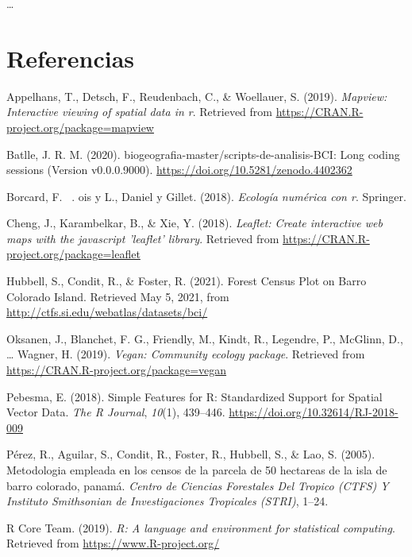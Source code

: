 \documentclass[11pt,]{article}
\begin{document}
\ldots

\section*{Referencias}\label{referencias}

\hypertarget{refs}{}
\hypertarget{ref-mapview}{}
Appelhans, T., Detsch, F., Reudenbach, C., \& Woellauer, S. (2019).
\emph{Mapview: Interactive viewing of spatial data in r}. Retrieved from
\url{https://CRAN.R-project.org/package=mapview}

\hypertarget{ref-jose_ramon_martinez_batlle_2020_4402362}{}
Batlle, J. R. M. (2020). biogeografia-master/scripts-de-analisis-BCI:
Long coding sessions (Version v0.0.0.9000).
\url{https://doi.org/10.5281/zenodo.4402362}

\hypertarget{ref-borcard2018numerical}{}
Borcard, F. ~. ois y L., Daniel y Gillet. (2018). \emph{Ecología
numérica con r}. Springer.

\hypertarget{ref-leaflet}{}
Cheng, J., Karambelkar, B., \& Xie, Y. (2018). \emph{Leaflet: Create
interactive web maps with the javascript 'leaflet' library}. Retrieved
from \url{https://CRAN.R-project.org/package=leaflet}

\hypertarget{ref-webcenso}{}
Hubbell, S., Condit, R., \& Foster, R. (2021). Forest Census Plot on
Barro Colorado Island. Retrieved May 5, 2021, from
\url{http://ctfs.si.edu/webatlas/datasets/bci/}

\hypertarget{ref-vegan}{}
Oksanen, J., Blanchet, F. G., Friendly, M., Kindt, R., Legendre, P.,
McGlinn, D., \ldots{} Wagner, H. (2019). \emph{Vegan: Community ecology
package}. Retrieved from \url{https://CRAN.R-project.org/package=vegan}

\hypertarget{ref-sf}{}
Pebesma, E. (2018). Simple Features for R: Standardized Support for
Spatial Vector Data. \emph{The R Journal}, \emph{10}(1), 439--446.
\url{https://doi.org/10.32614/RJ-2018-009}

\hypertarget{ref-perez2005metodologia}{}
Pérez, R., Aguilar, S., Condit, R., Foster, R., Hubbell, S., \& Lao, S.
(2005). Metodologia empleada en los censos de la parcela de 50 hectareas
de la isla de barro colorado, panamá. \emph{Centro de Ciencias
Forestales Del Tropico (CTFS) Y Instituto Smithsonian de Investigaciones
Tropicales (STRI)}, 1--24.

\hypertarget{ref-citadeR}{}
R Core Team. (2019). \emph{R: A language and environment for statistical
computing}. Retrieved from \url{https://www.R-project.org/}
\end{document}
